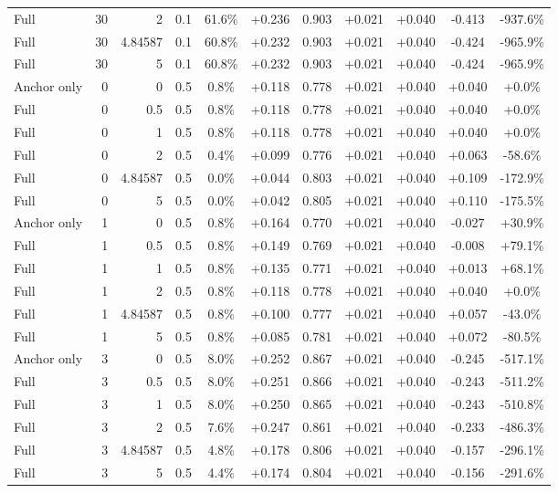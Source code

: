 \begin{table}[htbp]
\begin{tabular}{lrrrccccccc}
Full & 30 & 2 & 0.1 & 61.6\% & +0.236 & 0.903 & +0.021 & +0.040 & -0.413 & -937.6\% \\
Full & 30 & 4.84587 & 0.1 & 60.8\% & +0.232 & 0.903 & +0.021 & +0.040 & -0.424 & -965.9\% \\
Full & 30 & 5 & 0.1 & 60.8\% & +0.232 & 0.903 & +0.021 & +0.040 & -0.424 & -965.9\% \\
Anchor only & 0 & 0 & 0.5 & 0.8\% & +0.118 & 0.778 & +0.021 & +0.040 & +0.040 & +0.0\% \\
Full & 0 & 0.5 & 0.5 & 0.8\% & +0.118 & 0.778 & +0.021 & +0.040 & +0.040 & +0.0\% \\
Full & 0 & 1 & 0.5 & 0.8\% & +0.118 & 0.778 & +0.021 & +0.040 & +0.040 & +0.0\% \\
Full & 0 & 2 & 0.5 & 0.4\% & +0.099 & 0.776 & +0.021 & +0.040 & +0.063 & -58.6\% \\
Full & 0 & 4.84587 & 0.5 & 0.0\% & +0.044 & 0.803 & +0.021 & +0.040 & +0.109 & -172.9\% \\
Full & 0 & 5 & 0.5 & 0.0\% & +0.042 & 0.805 & +0.021 & +0.040 & +0.110 & -175.5\% \\
Anchor only & 1 & 0 & 0.5 & 0.8\% & +0.164 & 0.770 & +0.021 & +0.040 & -0.027 & +30.9\% \\
Full & 1 & 0.5 & 0.5 & 0.8\% & +0.149 & 0.769 & +0.021 & +0.040 & -0.008 & +79.1\% \\
Full & 1 & 1 & 0.5 & 0.8\% & +0.135 & 0.771 & +0.021 & +0.040 & +0.013 & +68.1\% \\
Full & 1 & 2 & 0.5 & 0.8\% & +0.118 & 0.778 & +0.021 & +0.040 & +0.040 & +0.0\% \\
Full & 1 & 4.84587 & 0.5 & 0.8\% & +0.100 & 0.777 & +0.021 & +0.040 & +0.057 & -43.0\% \\
Full & 1 & 5 & 0.5 & 0.8\% & +0.085 & 0.781 & +0.021 & +0.040 & +0.072 & -80.5\% \\
Anchor only & 3 & 0 & 0.5 & 8.0\% & +0.252 & 0.867 & +0.021 & +0.040 & -0.245 & -517.1\% \\
Full & 3 & 0.5 & 0.5 & 8.0\% & +0.251 & 0.866 & +0.021 & +0.040 & -0.243 & -511.2\% \\
Full & 3 & 1 & 0.5 & 8.0\% & +0.250 & 0.865 & +0.021 & +0.040 & -0.243 & -510.8\% \\
Full & 3 & 2 & 0.5 & 7.6\% & +0.247 & 0.861 & +0.021 & +0.040 & -0.233 & -486.3\% \\
Full & 3 & 4.84587 & 0.5 & 4.8\% & +0.178 & 0.806 & +0.021 & +0.040 & -0.157 & -296.1\% \\
Full & 3 & 5 & 0.5 & 4.4\% & +0.174 & 0.804 & +0.021 & +0.040 & -0.156 & -291.6\% \\

\end{tabular}
\end{table}
